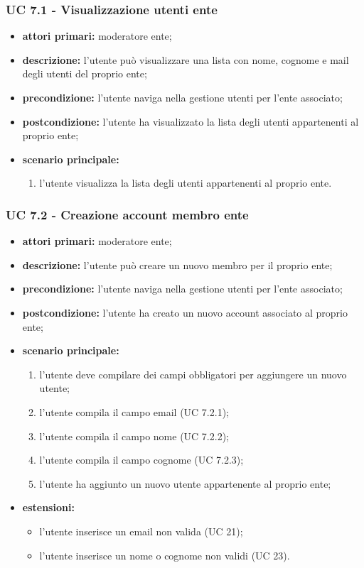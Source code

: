 			\subsubsection{UC 7.1 - Visualizzazione utenti ente}
			\begin{itemize}
				\item \textbf{attori primari:} moderatore ente;
				\item \textbf{descrizione:} l'utente può visualizzare una lista con nome, cognome e mail degli utenti del proprio ente;
				\item \textbf{precondizione:} l'utente naviga nella gestione utenti per l'ente associato;
				\item \textbf{postcondizione:} l'utente ha visualizzato la lista degli utenti appartenenti al proprio ente;
				\item \textbf{scenario principale:}
				\begin{enumerate}
					\item{l'utente visualizza la lista degli utenti appartenenti al proprio ente.}
				\end{enumerate}
			\end{itemize}

			\subsubsection{UC 7.2 - Creazione account membro ente}
			\begin{itemize}
				\item \textbf{attori primari:} moderatore ente;
				\item \textbf{descrizione:} l'utente può creare un nuovo membro per il proprio ente;
				\item \textbf{precondizione:} l'utente naviga nella gestione utenti per l'ente associato;
				\item \textbf{postcondizione:} l'utente ha creato un nuovo account associato al proprio ente;
				\item \textbf{scenario principale:}
				\begin{enumerate}
					\item{l'utente deve compilare dei campi obbligatori per aggiungere un nuovo utente;}
					\item{l'utente compila il campo email (UC 7.2.1);}
					\item{l'utente compila il campo nome (UC 7.2.2);}
					\item{l'utente compila il campo cognome (UC 7.2.3);}
					\item{l'utente ha aggiunto un nuovo utente appartenente al proprio ente;}
				\end{enumerate}
				\item \textbf{estensioni:}
				\begin{itemize}
					\item l'utente inserisce un email non valida (UC 21);
					\item l'utente inserisce un nome o cognome non validi (UC 23).
				\end{itemize}
			\end{itemize}

